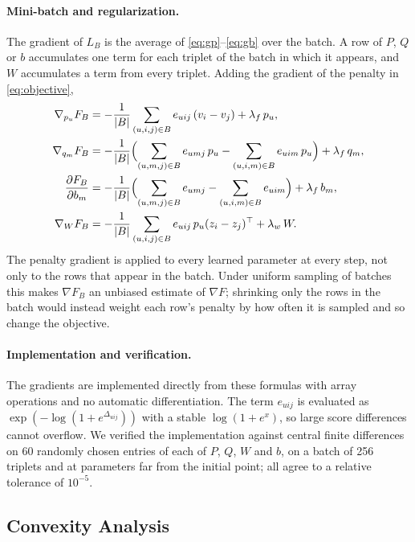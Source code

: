 \documentclass[12pt,a4paper]{article}
\begin{document}
\paragraph{Mini-batch and regularization.} The gradient of $L_B$ is the
average of \eqref{eq:gp}--\eqref{eq:gb} over the batch. A row of $P$, $Q$ or
$b$ accumulates one term for each triplet of the batch in which it appears,
and $W$ accumulates a term from every triplet. Adding the gradient of the
penalty in \eqref{eq:objective},
\begin{align}
    \nabla_{p_u} F_B &= -\frac{1}{|B|}\sum_{(u,i,j) \in B} e_{uij}\,(v_i - v_j)
        + \lambda_f\, p_u, \\
    \nabla_{q_m} F_B &= -\frac{1}{|B|}\Bigl(\sum_{(u,m,j) \in B} e_{umj}\,p_u
        - \sum_{(u,i,m) \in B} e_{uim}\,p_u\Bigr) + \lambda_f\, q_m, \\
    \frac{\partial F_B}{\partial b_m} &= -\frac{1}{|B|}\Bigl(\sum_{(u,m,j) \in B} e_{umj}
        - \sum_{(u,i,m) \in B} e_{uim}\Bigr) + \lambda_f\, b_m, \\
    \nabla_{W} F_B &= -\frac{1}{|B|}\sum_{(u,i,j) \in B} e_{uij}\,p_u (z_i - z_j)^\top
        + \lambda_w\, W .
\end{align}
The penalty gradient is applied to every learned parameter at every step, not
only to the rows that appear in the batch. Under uniform sampling of batches
this makes $\nabla F_B$ an unbiased estimate of $\nabla F$; shrinking only the
rows in the batch would instead weight each row's penalty by how often it is
sampled and so change the objective.

\paragraph{Implementation and verification.} The gradients are implemented
directly from these formulas with array operations and no automatic
differentiation. The term $e_{uij}$ is evaluated as
$\exp(-\log(1 + e^{\Delta_{uij}}))$ with a stable $\log(1 + e^x)$, so large
score differences cannot overflow. We verified the implementation against
central finite differences on 60 randomly chosen entries of each of $P$, $Q$,
$W$ and $b$, on a batch of 256 triplets and at parameters far from the
initial point; all agree to a relative tolerance of $10^{-5}$.

\subsection{Convexity Analysis}
\end{document}
